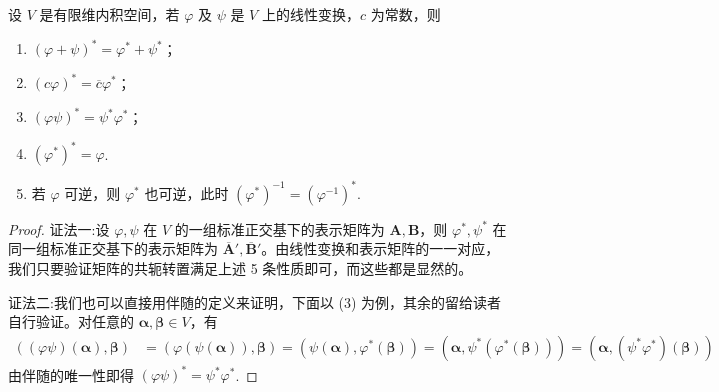 \documentclass[../../main.tex]{subfiles}
\begin{document}
\begin{theorem}[伴随算子的性质]\label{theorem:伴随算子的性质}
设 $V$ 是有限维内积空间，若 $\varphi$ 及 $\psi$ 是 $V$ 上的线性变换，$c$ 为常数，则
\begin{enumerate}[(1)]
\item $(\varphi + \psi)^* = \varphi^* + \psi^*$；

\item $(c\varphi)^* = \overline{c}\varphi^*$；

\item $(\varphi\psi)^* = \psi^*\varphi^*$；

\item $(\varphi^*)^* = \varphi$.

\item 若 \(\varphi\) 可逆，则 \(\varphi^*\) 也可逆，此时 \((\varphi^*)^{-1}=(\varphi^{-1})^*\). 
\end{enumerate} 
\end{theorem}
\begin{proof}
{\color{blue}证法一:}设 $\varphi, \psi$ 在 $V$ 的一组标准正交基下的表示矩阵为 $\boldsymbol{A}, \boldsymbol{B}$，则 $\varphi^*, \psi^*$ 在同一组标准正交基下的表示矩阵为 $\overline{\boldsymbol{A}}', \overline{\boldsymbol{B}}'$。由线性变换和表示矩阵的一一对应，我们只要验证矩阵的共轭转置满足上述 5 条性质即可，而这些都是显然的。

{\color{blue}证法二:}我们也可以直接用伴随的定义来证明，下面以 (3) 为例，其余的留给读者自行验证。对任意的 $\boldsymbol{\alpha}, \boldsymbol{\beta} \in V$，有
\begin{align*}
((\varphi\psi)(\boldsymbol{\alpha}), \boldsymbol{\beta}) &= (\varphi(\psi(\boldsymbol{\alpha})), \boldsymbol{\beta}) = (\psi(\boldsymbol{\alpha}), \varphi^*(\boldsymbol{\beta})) = (\boldsymbol{\alpha}, \psi^*(\varphi^*(\boldsymbol{\beta}))) = (\boldsymbol{\alpha}, (\psi^*\varphi^*)(\boldsymbol{\beta}))
\end{align*}
由伴随的唯一性即得 $(\varphi\psi)^* = \psi^*\varphi^*$.
\end{proof}
\end{document}
